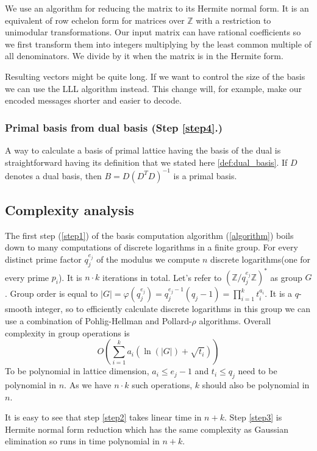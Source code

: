 \documentclass[12pt]{article}
\newcommand{\ZZ}{\mathbb{Z}}
\begin{document}
We use an algorithm for reducing the matrix to its Hermite normal form. It is an equivalent of row echelon form for matrices over $\ZZ$ with a restriction to unimodular transformations. Our input matrix can have rational coefficients so we first transform them into integers multiplying by the least common multiple of all denominators. We divide by it when the matrix is in the Hermite form.

Resulting vectors might be quite long. If we want to control the size of the basis we can use the LLL algorithm instead. This change will, for example, make our encoded messages shorter and easier to decode.

\subsubsection{Primal basis from dual basis (Step \ref{step4}.)}
\label{subsubsec:primal_from_dual}
A way to calculate a basis of primal lattice having the basis of the dual is straightforward having its definition that we stated here \ref{def:dual_basis}. If $D$ denotes a dual basis, then $B = D(D^{T}D)^{-1}$ is  a primal basis.


\subsection{Complexity analysis}
\label{subsec:complexity_integers}


The first step (\ref{step1}) of the basis computation algorithm (\ref{algorithm}) boils down to many computations of discrete logarithms in a finite group. For every distinct prime factor $q_{j}^{e_{j}}$ of the modulus we compute $n$ discrete logarithms(one for every prime $p_{i}$). It is $n \cdot k$ iterations in total. Let's refer to $(\ZZ/q_{j}^{e_{j}}\ZZ)^*$ as group $G$. Group order is equal to $|G| = \varphi(q_{j}^{e_{j}}) =  q_{j}^{e_{j}-1}(q_{j}-1) = \prod_{i=1}^{k} t_{i}^{a_{i}}$.
It is a $q$-smooth integer, so to efficiently calculate discrete logarithms in this group we can use a combination of Pohlig-Hellman \cite{[PH78]} and Pollard-$\rho$ \cite{[Pol78]} algorithms. Overall complexity in group operations is
\[
    O(\sum_{i=1}^{k} a_{i}(\ln(|G|) + \sqrt{t_{i}}))
\]
To be polynomial in lattice dimension, $a_{i} \leq e_{j}-1$ and $t_{i} \leq q_{j}$ need to be polynomial in $n$. As we have $n \cdot k$ such operations, $k$ should also be polynomial in $n$.

It is easy to see that step \ref{step2} takes linear time in $n + k$. Step \ref{step3} is Hermite normal form reduction which has the same complexity as Gaussian elimination so runs in time polynomial in $n + k$.
\end{document}
